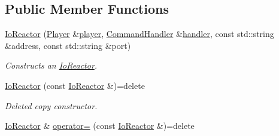 \subsection*{Public Member Functions}
\begin{DoxyCompactItemize}
\item 
\hyperlink{classIoReactor_aace954427c447c73caf6b8dbcd367284}{Io\+Reactor} (\hyperlink{classPlayer}{Player} \&\hyperlink{classIoReactor_a795397b36da55b59bff63b455a344dea}{player}, \hyperlink{classCommandHandler}{Command\+Handler} \&\hyperlink{classIoReactor_a81bf838edb7adf1edcb992bfe61d6b78}{handler}, const std\+::string \&address, const std\+::string \&port)
\begin{DoxyCompactList}\small\item\em Constructs an \hyperlink{classIoReactor}{Io\+Reactor}. \end{DoxyCompactList}\item 
\hypertarget{classIoReactor_a5b0292192e98a5e6e0fcd65631b3e0fe}{\hyperlink{classIoReactor_a5b0292192e98a5e6e0fcd65631b3e0fe}{Io\+Reactor} (const \hyperlink{classIoReactor}{Io\+Reactor} \&)=delete}\label{classIoReactor_a5b0292192e98a5e6e0fcd65631b3e0fe}

\begin{DoxyCompactList}\small\item\em Deleted copy constructor. \end{DoxyCompactList}\item 
\hypertarget{classIoReactor_a5e05bcbdf86f3124adb67ce76bf4f8a9}{\hyperlink{classIoReactor}{Io\+Reactor} \& \hyperlink{classIoReactor_a5e05bcbdf86f3124adb67ce76bf4f8a9}{operator=} (const \hyperlink{classIoReactor}{Io\+Reactor} \&)=delete}\label{classIoReactor_a5e05bcbdf86f3124adb67ce76bf4f8a9}


\end{DoxyCompactItemize}
